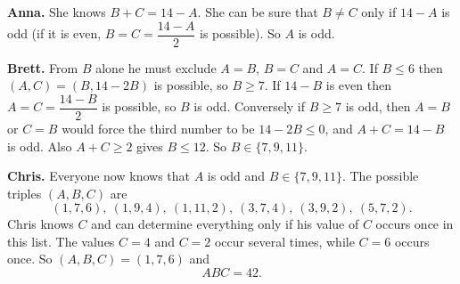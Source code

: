 \textbf{Anna.} She knows $B+C=14-A$. She can be sure that $B\neq C$ only if $14-A$ is odd (if it is even, $B=C=\dfrac{14-A}{2}$ is possible). So $A$ is odd.

\textbf{Brett.} From $B$ alone he must exclude $A=B$, $B=C$ and $A=C$. If $B\le6$ then $(A,C)=(B,14-2B)$ is possible, so $B\ge7$. If $14-B$ is even then $A=C=\dfrac{14-B}{2}$ is possible, so $B$ is odd. Conversely if $B\ge7$ is odd, then $A=B$ or $C=B$ would force the third number to be $14-2B\le0$, and $A+C=14-B$ is odd. Also $A+C\ge2$ gives $B\le12$. So $B\in\{7,9,11\}$.

\textbf{Chris.} Everyone now knows that $A$ is odd and $B\in\{7,9,11\}$. The possible triples $(A,B,C)$ are
\[
(1,7,6),\ (1,9,4),\ (1,11,2),\ (3,7,4),\ (3,9,2),\ (5,7,2).
\]
Chris knows $C$ and can determine everything only if his value of $C$ occurs once in this list. The values $C=4$ and $C=2$ occur several times, while $C=6$ occurs once. So $(A,B,C)=(1,7,6)$ and
\[
ABC=\boxed{42}.
\]
